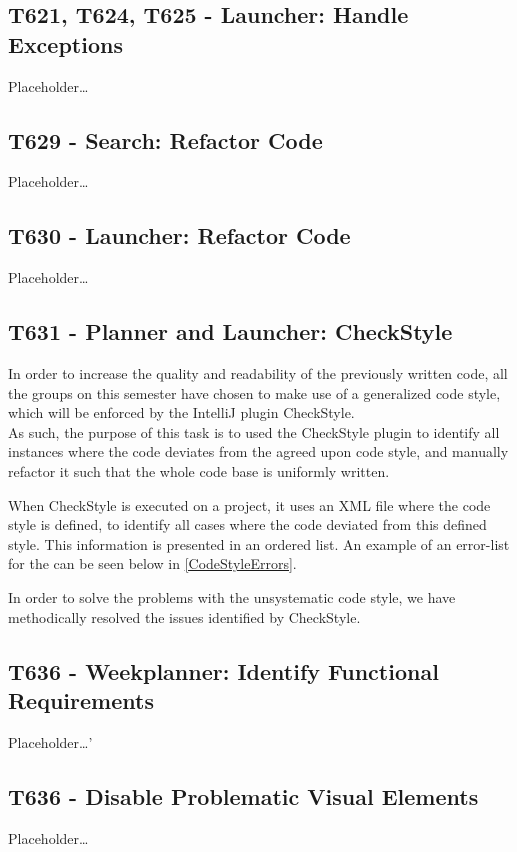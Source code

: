 \subsection{T621, T624, T625 - Launcher: Handle Exceptions}
Placeholder\ldots

\subsection{T629 - Search: Refactor Code}
Placeholder\ldots

\subsection{T630 - Launcher: Refactor Code}
Placeholder\ldots

\subsection{T631 - Planner and Launcher: CheckStyle}
In order to increase the quality and readability of the previously written code,
all the groups on this semester have chosen to make use of a generalized code
style, which will be enforced by the IntelliJ plugin CheckStyle.\\
As such, the purpose of this task is to used the CheckStyle plugin to identify
all instances where the code deviates from the agreed upon code style, and
manually refactor it such that the whole code base is uniformly written.\nl

When CheckStyle is executed on a project, it uses an XML file where the code
style is defined, to identify all cases where the code deviated from this
defined style. This information is presented in an ordered list. An example of
an error-list for the  can be seen below in
\autoref{CodeStyleErrors}.


In order to solve the problems with the unsystematic code style, we have
methodically resolved the issues identified by CheckStyle.

\subsection{T636 - Weekplanner: Identify Functional Requirements}
Placeholder\ldots'


\subsection{T636 - Disable Problematic Visual Elements}
Placeholder\ldots

